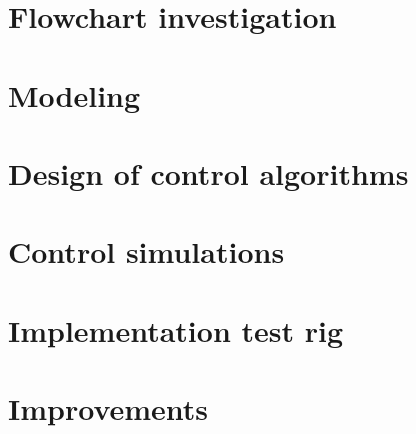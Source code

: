 

\section{Flowchart investigation}


\section{Modeling}

\section{Design of control algorithms}

\section{Control simulations}

\section{Implementation test rig}

\section{Improvements}
